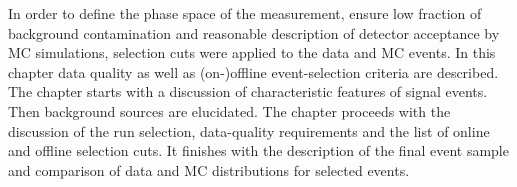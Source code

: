 In order to define the phase space of the measurement, ensure low fraction of background contamination and reasonable description of detector acceptance by MC simulations, selection cuts were applied to the data and MC events. In this chapter data quality as well as (on-)offline event-selection criteria are described. The chapter starts with a discussion of characteristic features of signal events. Then background sources are elucidated. The chapter proceeds with the discussion of the run selection, data-quality requirements and the list of online and offline selection cuts. It finishes with the description of the final event sample and comparison of data and MC distributions for selected events.


